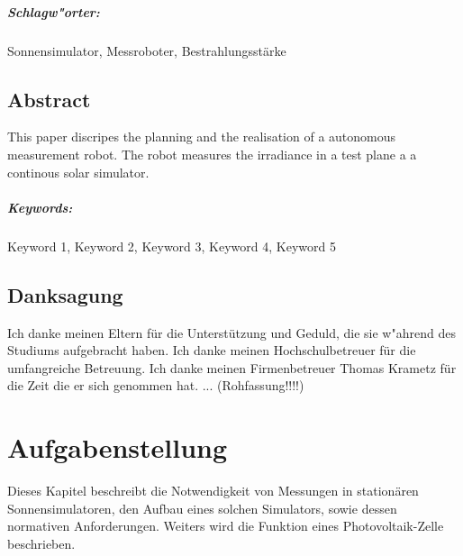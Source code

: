 \documentclass[a4paper,bibtotoc,oneside]{scrbook}
\begin{document}
\paragraph*{Schlagw"orter:} Sonnensimulator, Messroboter, Bestrahlungsstärke


\newpage

\section*{Abstract}\thispagestyle{empty}
This paper discripes the planning and the realisation of a autonomous measurement robot. The robot measures the irradiance in a test plane a a continous solar simulator.
\\ \vfill
\paragraph*{Keywords:} Keyword 1, Keyword 2, Keyword 3, Keyword 4, Keyword 5
\newpage

\section*{Danksagung}\thispagestyle{empty}
Ich danke meinen Eltern für die Unterstützung und Geduld, die sie w"ahrend des Studiums aufgebracht haben.
Ich danke meinen Hochschulbetreuer für die umfangreiche Betreuung.
Ich danke meinen Firmenbetreuer Thomas Krametz für die Zeit die er sich genommen hat.
... (Rohfassung!!!!)
\newpage

\tableofcontents\thispagestyle{empty}
\newpage

\setcounter{page}{1}

\chapter{Aufgabenstellung}

Dieses Kapitel beschreibt die Notwendigkeit von Messungen in stationären Sonnensimulatoren, den Aufbau eines solchen Simulators, sowie dessen normativen Anforderungen. Weiters wird die Funktion eines Photovoltaik-Zelle beschrieben.
\end{document}
